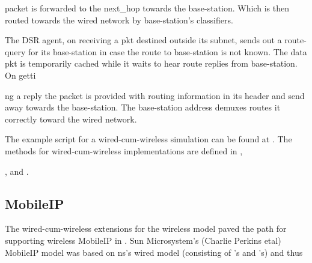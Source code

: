 {packet is forwarded to the next\_hop towards the base-station. Which is then routed towards the wired network by base-station's classifiers.

The DSR agent, on receiving a pkt destined outside its subnet, sends out a route-query for its base-station in case the route to base-station is not known. The data pkt is temporarily cached while it waits to hear route replies from base-station. On getti






















ng a reply the packet is provided with routing information in its header and send away towards the base-station. The base-station address demuxes routes it correctly toward the wired network. 

The example script for a wired-cum-wireless simulation can be found at . The methods for wired-cum-wireless implementations are defined in , 






















,  and .


\subsection{MobileIP}
\label{sec:mobileip}

The wired-cum-wireless extensions for the wireless model paved the path for supporting wireless MobileIP in \ns. Sun Microsystem's (Charlie Perkins etal) MobileIP model was based on ns's wired model (consisting of 's and 's) and thus






















}
